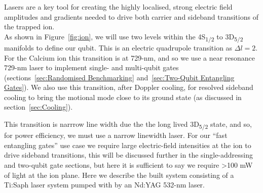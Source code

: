     Lasers are a key tool for creating the highly localised, strong electric
    field amplitudes and gradients needed to drive both carrier and sideband
    transitions of the trapped ion.\\ As shown in Figure~\ref{fig:ion}, we will
    use two levels within the 4S\textsubscript{1/2} to 3D\textsubscript{5/2}
    manifolds to define our qubit. This is an electric quadrupole transition as
    $\Delta l = 2$.  For the Calcium ion this transition is at 729-nm, and so we
    use a near resonance 729-nm laser to implement single- and multi-qubit gates
    (sections~\ref{sec:Randomised Benchmarking} and~\ref{sec:Two-Qubit
    Entangling Gates}). We also use this transition, after Doppler cooling, for
    resolved sideband cooling to bring the motional mode close to its ground
    state (as discussed in section~\ref{sec:Cooling}).

    This transition is narrrow line width due the the long lived
    3D\textsubscript{5/2} state, and so, for power efficiency, we must use a
    narrow linewidth laser. For our ``fast entangling gates'' use case we
    require large electric-field intensities at the ion to drive sideband
    transitions, this will be discussed further in the single-addressing and
    two-qubit gate sections, but here it is sufficient to say we require >100 mW
    of light at the ion plane.  Here we describe the built system 
    consisting of a Ti:Saph laser system pumped with by an Nd:YAG 532-nm laser.\\

